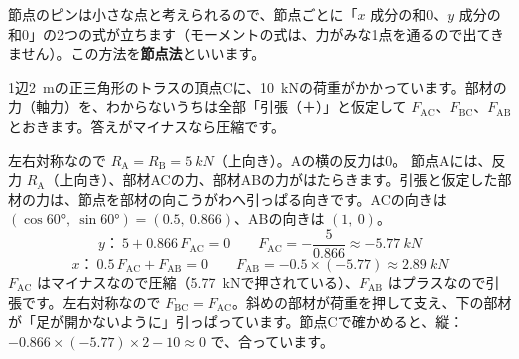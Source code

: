 節点のピンは小さな点と考えられるので、節点ごとに「$x$ 成分の和0、$y$ 成分の和0」の2つの式が立ちます（モーメントの式は、力がみな1点を通るので出てきません）。この方法を\textbf{節点法}といいます。

\noindent\begin{minipage}[c]{0.5\linewidth}
\centering
{}
\end{minipage}\hfill
\begin{minipage}[c]{0.46\linewidth}
1辺\qty{2}{m}の正三角形のトラスの頂点Cに、\qty{10}{kN}の荷重がかかっています。部材の力（軸力）を、わからないうちは全部「引張（＋）」と仮定して $F_{\mathrm{AC}}$、$F_{\mathrm{BC}}$、$F_{\mathrm{AB}}$ とおきます。答えがマイナスなら圧縮です。
\end{minipage}

\par\vspace{4pt}
左右対称なので $R_{\mathrm A}=R_{\mathrm B}=\qty{5}{kN}$（上向き）。Aの横の反力は0。
節点Aには、反力 $R_{\mathrm A}$（上向き）、部材ACの力、部材ABの力がはたらきます。引張と仮定した部材の力は、節点を部材の向こうがわへ引っぱる向きです。ACの向きは $(\cos60°,\ \sin60°)=(0.5,\ 0.866)$、ABの向きは $(1,\ 0)$。
\[ y\text{：}\ 5+0.866\,F_{\mathrm{AC}}=0\qquad F_{\mathrm{AC}}=-\frac{5}{0.866}\approx\qty{-5.77}{kN} \]
\[ x\text{：}\ 0.5\,F_{\mathrm{AC}}+F_{\mathrm{AB}}=0\qquad F_{\mathrm{AB}}=-0.5\times(-5.77)\approx\qty{2.89}{kN} \]
$F_{\mathrm{AC}}$ はマイナスなので圧縮（\qty{5.77}{kN}で押されている）、$F_{\mathrm{AB}}$ はプラスなので引張です。左右対称なので $F_{\mathrm{BC}}=F_{\mathrm{AC}}$。斜めの部材が荷重を押して支え、下の部材が「足が開かないように」引っぱっています。節点Cで確かめると、縦：$-0.866\times(-5.77)\times2-10\approx0$ で、合っています。

